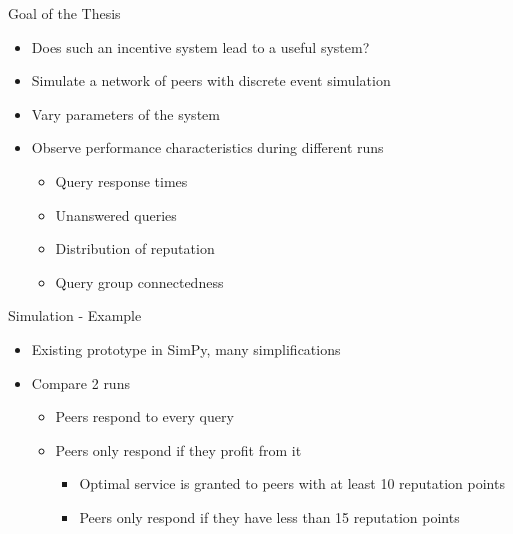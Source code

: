 \documentclass[presentation,english,usenames,dvipsnames]{beamer}
\begin{document}
\begin{frame}{Goal of the Thesis}
  \begin{itemize}
    \item Does such an incentive system lead to a useful system?
    \item Simulate a network of peers with discrete event simulation
    \item Vary parameters of the system
    \item Observe performance characteristics during different runs
    \begin{itemize}
      \item Query response times
      \item Unanswered queries
      \item Distribution of reputation
      \item Query group connectedness
    \end{itemize}
  \end{itemize}
\end{frame}

\begin{frame}{Simulation - Example}
  \begin{itemize}
    \item Existing prototype in SimPy, many simplifications
    \item Compare 2 runs
    \begin{itemize}
      \item Peers respond to every query
      \item Peers only respond if they profit from it
      \begin{itemize}
        \item Optimal service is granted to peers with at least 10 reputation
              points
        \item Peers only respond if they have less than 15 reputation points
      \end{itemize}
    \end{itemize}
  \end{itemize}
\end{frame}
\end{document}
